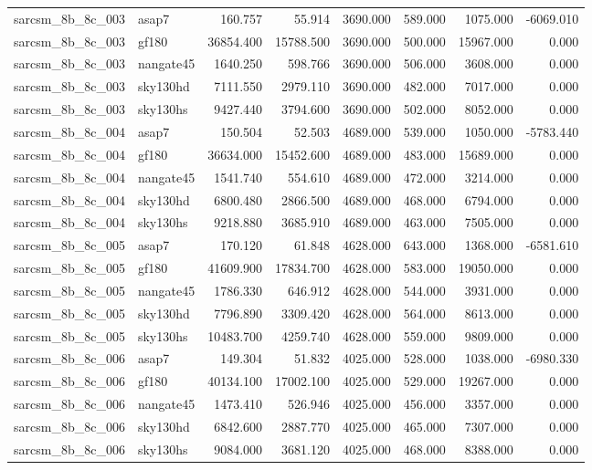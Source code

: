 \begin{tabular}{llrrrrrr}
sarcsm\_8b\_8c\_003 & asap7 & 160.757 & 55.914 & 3690.000 & 589.000 & 1075.000 & -6069.010 \\
sarcsm\_8b\_8c\_003 & gf180 & 36854.400 & 15788.500 & 3690.000 & 500.000 & 15967.000 & 0.000 \\
sarcsm\_8b\_8c\_003 & nangate45 & 1640.250 & 598.766 & 3690.000 & 506.000 & 3608.000 & 0.000 \\
sarcsm\_8b\_8c\_003 & sky130hd & 7111.550 & 2979.110 & 3690.000 & 482.000 & 7017.000 & 0.000 \\
sarcsm\_8b\_8c\_003 & sky130hs & 9427.440 & 3794.600 & 3690.000 & 502.000 & 8052.000 & 0.000 \\
sarcsm\_8b\_8c\_004 & asap7 & 150.504 & 52.503 & 4689.000 & 539.000 & 1050.000 & -5783.440 \\
sarcsm\_8b\_8c\_004 & gf180 & 36634.000 & 15452.600 & 4689.000 & 483.000 & 15689.000 & 0.000 \\
sarcsm\_8b\_8c\_004 & nangate45 & 1541.740 & 554.610 & 4689.000 & 472.000 & 3214.000 & 0.000 \\
sarcsm\_8b\_8c\_004 & sky130hd & 6800.480 & 2866.500 & 4689.000 & 468.000 & 6794.000 & 0.000 \\
sarcsm\_8b\_8c\_004 & sky130hs & 9218.880 & 3685.910 & 4689.000 & 463.000 & 7505.000 & 0.000 \\
sarcsm\_8b\_8c\_005 & asap7 & 170.120 & 61.848 & 4628.000 & 643.000 & 1368.000 & -6581.610 \\
sarcsm\_8b\_8c\_005 & gf180 & 41609.900 & 17834.700 & 4628.000 & 583.000 & 19050.000 & 0.000 \\
sarcsm\_8b\_8c\_005 & nangate45 & 1786.330 & 646.912 & 4628.000 & 544.000 & 3931.000 & 0.000 \\
sarcsm\_8b\_8c\_005 & sky130hd & 7796.890 & 3309.420 & 4628.000 & 564.000 & 8613.000 & 0.000 \\
sarcsm\_8b\_8c\_005 & sky130hs & 10483.700 & 4259.740 & 4628.000 & 559.000 & 9809.000 & 0.000 \\
sarcsm\_8b\_8c\_006 & asap7 & 149.304 & 51.832 & 4025.000 & 528.000 & 1038.000 & -6980.330 \\
sarcsm\_8b\_8c\_006 & gf180 & 40134.100 & 17002.100 & 4025.000 & 529.000 & 19267.000 & 0.000 \\
sarcsm\_8b\_8c\_006 & nangate45 & 1473.410 & 526.946 & 4025.000 & 456.000 & 3357.000 & 0.000 \\
sarcsm\_8b\_8c\_006 & sky130hd & 6842.600 & 2887.770 & 4025.000 & 465.000 & 7307.000 & 0.000 \\
sarcsm\_8b\_8c\_006 & sky130hs & 9084.000 & 3681.120 & 4025.000 & 468.000 & 8388.000 & 0.000 \\

\end{tabular}
